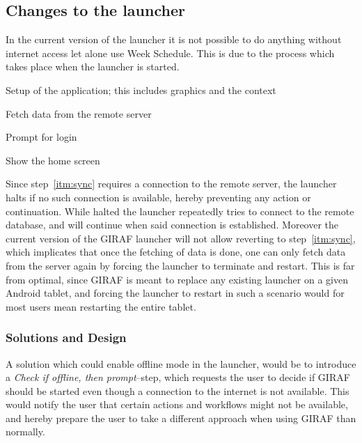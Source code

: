 \subsection{Changes to the launcher}
\label{sub:changes_to_the_launcher}
In the current version of the launcher it is not possible to do anything without internet access let alone use Week Schedule.
This is due to the process which takes place when the launcher is started. 
\begin{enumberate}
    \item Setup of the application; this includes graphics and the context
    \item\label{itm:sync} Fetch data from the remote server
    \item Prompt for login
    \item Show the home screen
\end{enumberate}
Since step~\ref{itm:sync} requires a connection to the remote server, the launcher halts if no such connection is available, hereby preventing any action or continuation.
While halted the launcher repeatedly tries to connect to the remote database, and will continue when said connection is established.
Moreover the current version of the GIRAF launcher will not allow reverting to step~\ref{itm:sync}, which implicates that once the fetching of data is done, one can only fetch data from the server again by forcing the launcher to terminate and restart.
This is far from optimal, since GIRAF is meant to replace any existing launcher on a given Android tablet, and forcing the launcher to restart in such a scenario would for most users mean restarting the entire tablet.

\subsubsection{Solutions and Design}
A solution which could enable offline mode in the launcher, would be to introduce a \textit{Check if offline, then prompt}--step, which requests the user to decide if GIRAF should be started even though a connection to the internet is not available.
This would notify the user that certain actions and workflows might not be available, and hereby prepare the user to take a different approach when using GIRAF than normally.

